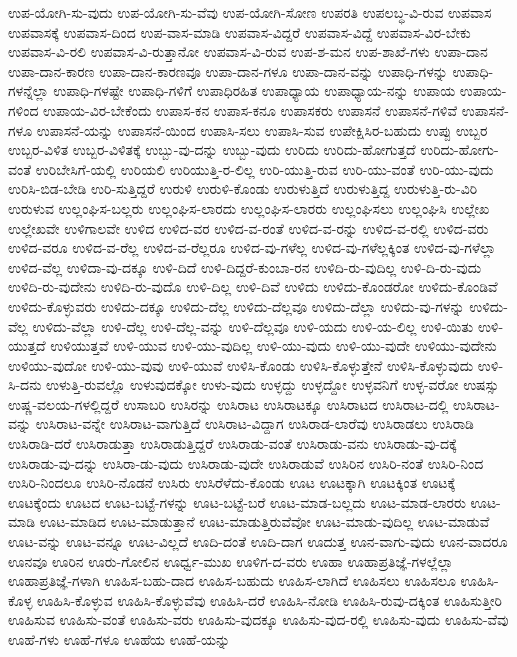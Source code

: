 {ಉಪ-ಯೋಗಿ-ಸು-ವುದು
ಉಪ-ಯೋಗಿ-ಸು-ವೆವು
ಉಪ-ಯೋಗಿ-ಸೋಣ
ಉಪರತಿ
ಉಪಲಬ್ಧ-ವಿ-ರುವ
ಉಪವಾಸ
ಉಪವಾಸಕ್ಕೆ
ಉಪವಾಸ-ದಿಂದ
ಉಪ-ವಾಸ-ಮಾಡಿ
ಉಪವಾಸ-ವಿದ್ದರೆ
ಉಪವಾಸ-ವಿದ್ದೆ
ಉಪವಾಸ-ವಿರ-ಬೇಕು
ಉಪವಾಸ-ವಿ-ರಲಿ
ಉಪವಾಸ-ವಿ-ರುತ್ತಾನೋ
ಉಪವಾಸ-ವಿ-ರುವ
ಉಪ-ಶ-ಮನ
ಉಪ-ಶಾಖೆ-ಗಳು
ಉಪಾ-ದಾನ
ಉಪಾ-ದಾನ-ಕಾರಣ
ಉಪಾ-ದಾನ-ಕಾರಣವೂ
ಉಪಾ-ದಾನ-ಗಳೂ
ಉಪಾ-ದಾನ-ವನ್ನು
ಉಪಾಧಿ-ಗಳನ್ನು
ಉಪಾಧಿ-ಗಳನ್ನೆಲ್ಲಾ
ಉಪಾಧಿ-ಗಳಷ್ಟೇ
ಉಪಾಧಿ-ಗಳಿಗೆ
ಉಪಾಧಿರಹಿತ
ಉಪಾಧ್ಯಾಯ
ಉಪಾಧ್ಯಾಯ-ನನ್ನು
ಉಪಾಯ
ಉಪಾಯ-ಗಳಿಂದ
ಉಪಾಯ-ವಿರ-ಬೇಕೆಂದು
ಉಪಾಸ-ಕನ
ಉಪಾಸ-ಕನೂ
ಉಪಾಸಕರು
ಉಪಾಸನೆ
ಉಪಾಸನೆ-ಗಳಿವೆ
ಉಪಾಸನೆ-ಗಳೂ
ಉಪಾಸನೆ-ಯನ್ನು
ಉಪಾಸನೆ-ಯಿಂದ
ಉಪಾಸಿ-ಸಲು
ಉಪಾಸಿ-ಸುವ
ಉಪೇಕ್ಷಿಸಿರ-ಬಹುದು
ಉಪ್ಪು
ಉಬ್ಬರ
ಉಬ್ಬರ-ವಿಳಿತ
ಉಬ್ಬರ-ವಿಳಿತಕ್ಕೆ
ಉಬ್ಬು-ವು-ದನ್ನು
ಉಬ್ಬು-ವುದು
ಉರಿದು
ಉರಿದು-ಹೋಗುತ್ತದೆ
ಉರಿದು-ಹೋಗು-ವಂತೆ
ಉರಿಬೇಸಿಗೆ-ಯಲ್ಲಿ
ಉರಿಯಲಿ
ಉರಿಯುತ್ತಿ-ರ-ಲಿಲ್ಲ
ಉರಿ-ಯುತ್ತಿ-ರುವ
ಉರಿ-ಯು-ವಂತೆ
ಉರಿ-ಯು-ವುದು
ಉರಿಸಿ-ಬಿಡ-ಬೇಡಿ
ಉರಿ-ಸುತ್ತಿದ್ದರೆ
ಉರುಳಿ
ಉರುಳಿ-ಕೊಂಡು
ಉರುಳುತ್ತಿದೆ
ಉರುಳುತ್ತಿದ್ದ
ಉರುಳುತ್ತಿ-ರು-ವಿರಿ
ಉರುಳುವ
ಉಲ್ಲಂಘಿಸ-ಬಲ್ಲರು
ಉಲ್ಲಂಘಿಸ-ಲಾರದು
ಉಲ್ಲಂಘಿಸ-ಲಾರರು
ಉಲ್ಲಂಘಿಸಲು
ಉಲ್ಲಂಘಿಸಿ
ಉಲ್ಲೇಖ
ಉಲ್ಲೇಖವೇ
ಉಳಿಗಾಲವೇ
ಉಳಿದ
ಉಳಿದ-ವರ
ಉಳಿದ-ವ-ರಂತೆ
ಉಳಿದ-ವ-ರನ್ನು
ಉಳಿದ-ವ-ರಲ್ಲಿ
ಉಳಿದ-ವರು
ಉಳಿದ-ವರೂ
ಉಳಿದ-ವ-ರೆಲ್ಲ
ಉಳಿದ-ವ-ರೆಲ್ಲರೂ
ಉಳಿದ-ವು-ಗಳೆಲ್ಲ
ಉಳಿದ-ವು-ಗಳೆಲ್ಲಕ್ಕಿಂತ
ಉಳಿದ-ವು-ಗಳೆಲ್ಲಾ
ಉಳಿದ-ವೆಲ್ಲ
ಉಳಿದಾ-ವು-ದಕ್ಕೂ
ಉಳಿ-ದಿದೆ
ಉಳಿ-ದಿದ್ದರೆ-ಕುಂಬಾ-ರನ
ಉಳಿದಿ-ರು-ವುದಿಲ್ಲ
ಉಳಿ-ದಿ-ರು-ವುದು
ಉಳಿದಿ-ರು-ವುದೇನು
ಉಳಿದಿ-ರು-ವುದೊ
ಉಳಿ-ದಿಲ್ಲ
ಉಳಿ-ದಿವೆ
ಉಳಿದು
ಉಳಿದು-ಕೊಂಡರೋ
ಉಳಿದು-ಕೊಂಡಿವೆ
ಉಳಿದು-ಕೊಳ್ಳುವರು
ಉಳಿದು-ದಕ್ಕೂ
ಉಳಿದು-ದೆಲ್ಲ
ಉಳಿದು-ದೆಲ್ಲವೂ
ಉಳಿದು-ದೆಲ್ಲಾ
ಉಳಿದು-ವು-ಗಳನ್ನು
ಉಳಿದು-ವೆಲ್ಲ
ಉಳಿದು-ವೆಲ್ಲಾ
ಉಳಿ-ದೆಲ್ಲ
ಉಳಿ-ದೆಲ್ಲ-ವನ್ನು
ಉಳಿ-ದೆಲ್ಲವೂ
ಉಳಿ-ಯದು
ಉಳಿ-ಯ-ಲಿಲ್ಲ
ಉಳಿ-ಯಿತು
ಉಳಿ-ಯುತ್ತದೆ
ಉಳಿಯುತ್ತವೆ
ಉಳಿ-ಯುವ
ಉಳಿ-ಯು-ವುದಿಲ್ಲ
ಉಳಿ-ಯು-ವುದು
ಉಳಿ-ಯು-ವುದೇ
ಉಳಿಯು-ವುದೇನು
ಉಳಿಯು-ವುದೋ
ಉಳಿ-ಯು-ವುವು
ಉಳಿ-ಯುವೆ
ಉಳಿಸಿ-ಕೊಂಡು
ಉಳಿಸಿ-ಕೊಳ್ಳುತ್ತೇನೆ
ಉಳಿಸಿ-ಕೊಳ್ಳುವುದು
ಉಳಿ-ಸಿ-ದನು
ಉಳುತ್ತಿ-ರುವಲ್ಲೊ
ಉಳುವುದಕ್ಕೋ
ಉಳು-ವುದು
ಉಳ್ಳದ್ದು
ಉಳ್ಳದ್ದೋ
ಉಳ್ಳವನಿಗೆ
ಉಳ್ಳ-ವರೋ
ಉಷಸ್ಸು
ಉಷ್ಣ-ವಲಯ-ಗಳಲ್ಲಿದ್ದರೆ
ಉಸಾಬರಿ
ಉಸಿರನ್ನು
ಉಸಿರಾಟ
ಉಸಿರಾಟಕ್ಕೂ
ಉಸಿರಾಟದ
ಉಸಿರಾಟ-ದಲ್ಲಿ
ಉಸಿರಾಟ-ವನ್ನು
ಉಸಿರಾಟ-ವನ್ನೇ
ಉಸಿರಾಟ-ವಾಗುತ್ತಿದೆ
ಉಸಿರಾಟ-ವಿದ್ದಾಗ
ಉಸಿರಾಡ-ಲಾರೆವು
ಉಸಿರಾಡಲು
ಉಸಿರಾಡಿ
ಉಸಿರಾಡಿ-ದರೆ
ಉಸಿರಾಡುತ್ತಾ
ಉಸಿರಾಡುತ್ತಿದ್ದರೆ
ಉಸಿರಾಡು-ವಂತೆ
ಉಸಿರಾಡು-ವನು
ಉಸಿರಾಡು-ವು-ದಕ್ಕೆ
ಉಸಿರಾಡು-ವು-ದನ್ನು
ಉಸಿರಾ-ಡು-ವುದು
ಉಸಿರಾಡು-ವುದೇ
ಉಸಿರಾಡುವೆ
ಉಸಿರಿನ
ಉಸಿರಿ-ನಂತೆ
ಉಸಿರಿ-ನಿಂದ
ಉಸಿರಿ-ನಿಂದಲೂ
ಉಸಿರಿ-ನೊಡನೆ
ಉಸಿರು
ಉಸಿರೆಳೆದು-ಕೊಂಡು
ಊಟ
ಊಟಕ್ಕಾಗಿ
ಊಟಕ್ಕಿಂತ
ಊಟಕ್ಕೆ
ಊಟಕ್ಕೆಂದು
ಊಟದ
ಊಟ-ಬಟ್ಟೆ-ಗಳನ್ನು
ಊಟ-ಬಟ್ಟೆ-ಬರೆ
ಊಟ-ಮಾಡ-ಬಲ್ಲದು
ಊಟ-ಮಾಡ-ಲಾರರು
ಊಟ-ಮಾಡಿ
ಊಟ-ಮಾಡಿದ
ಊಟ-ಮಾಡುತ್ತಾನೆ
ಊಟ-ಮಾಡುತ್ತಿರುವೆವೋ
ಊಟ-ಮಾಡು-ವುದಿಲ್ಲ
ಊಟ-ಮಾಡುವೆ
ಊಟ-ವನ್ನು
ಊಟ-ವನ್ನೂ
ಊಟ-ವಿಲ್ಲದೆ
ಊದಿ-ದಂತೆ
ಊದಿ-ದಾಗ
ಊದುತ್ತ
ಊನ-ವಾಗು-ವುದು
ಊನ-ವಾದರೂ
ಊನವೂ
ಊರಿನ
ಊರು-ಗೋಲಿನ
ಊರ್ಧ್ವ-ಮುಖ
ಊಳಿಗ-ದ-ವರು
ಊಹಾ
ಊಹಾಪ್ರತಿಜ್ಞೆ-ಗಳಲ್ಲೆಲ್ಲಾ
ಊಹಾಪ್ರತಿಜ್ಞೆ-ಗಳಾಗಿ
ಊಹಿಸ-ಬಹು-ದಾದ
ಊಹಿಸ-ಬಹುದು
ಊಹಿಸ-ಲಾಗಿದೆ
ಊಹಿಸಲು
ಊಹಿಸಲೂ
ಊಹಿಸಿ-ಕೊಳ್ಳ
ಊಹಿಸಿ-ಕೊಳ್ಳುವ
ಊಹಿಸಿ-ಕೊಳ್ಳುವೆವು
ಊಹಿಸಿ-ದರೆ
ಊಹಿಸಿ-ನೋಡಿ
ಊಹಿಸಿ-ರುವು-ದಕ್ಕಿಂತ
ಊಹಿಸುತ್ತೀರಿ
ಊಹಿಸುವ
ಊಹಿಸು-ವಂತೆ
ಊಹಿಸು-ವರು
ಊಹಿಸು-ವುದಕ್ಕೂ
ಊಹಿಸು-ವುದ-ರಲ್ಲಿ
ಊಹಿಸು-ವುದು
ಊಹಿಸು-ವೆವು
ಊಹೆ-ಗಳು
ಊಹೆ-ಗಳೂ
ಊಹೆಯ
ಊಹೆ-ಯನ್ನು
}
